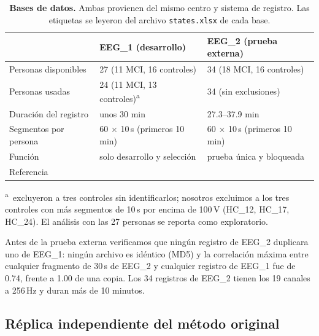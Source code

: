 \begin{table}[t]
\centering\small
\caption{\textbf{Bases de datos.} Ambas provienen del mismo centro y sistema de registro. Las etiquetas se leyeron del archivo \texttt{states.xlsx} de cada base.}
\label{tab:data}
\begin{tabular}{@{}lll@{}}
\toprule
 & EEG\_1 (desarrollo) & EEG\_2 (prueba externa) \\
\midrule
Personas disponibles & 27 (11 MCI, 16 controles) & 34 (18 MCI, 16 controles) \\
Personas usadas & 24 (11 MCI, 13 controles)\textsuperscript{a} & 34 (sin exclusiones) \\
Duración del registro & unos 30 min & 27.3--37.9 min \\
Segmentos por persona & 60 $\times$ 10\,s (primeros 10 min) & 60 $\times$ 10\,s (primeros 10 min) \\
Función & solo desarrollo y selección & prueba única y bloqueada \\
Referencia & \citet{kashefpoor2016} & \citet{kashefpoor2019} \\
\bottomrule
\end{tabular}

\smallskip\footnotesize\raggedright \textsuperscript{a}\,\citet{aljalal2024} excluyeron a tres controles sin identificarlos; nosotros excluimos a los tres controles con más segmentos de 10\,s por encima de 100\,\textmu V (HC\_12, HC\_17, HC\_24). El análisis con las 27 personas se reporta como exploratorio.
\end{table}

Antes de la prueba externa verificamos que ningún registro de EEG\_2 duplicara uno de EEG\_1: ningún archivo es idéntico (MD5) y la correlación máxima entre cualquier fragmento de 30\,s de EEG\_2 y cualquier registro de EEG\_1 fue de 0.74, frente a 1.00 de una copia. Los 34 registros de EEG\_2 tienen los 19 canales a 256\,Hz y duran más de 10 minutos.

\subsection{Réplica independiente del método original}


